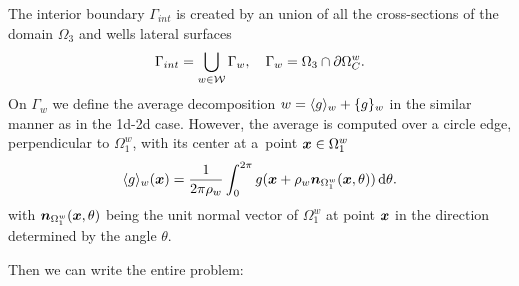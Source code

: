 The interior boundary $\Gamma_{int}$ is created by an union of all the cross-sections of the domain $\Omega_3$
and wells lateral surfaces
\begin{equation}
    \Gamma_{int} = \bigcup_{\substack{w\in\mathcal{W}}} \Gamma_w, \quad \Gamma_w = \Omega_3 \cap \partial\Omega^w_C.
\end{equation}
On $\Gamma_w$ we define the average decomposition $w = \langle g\rangle_w + \{g\}_w$ in the similar manner
as in the 1d-2d case. However, the average is computed over a circle edge, perpendicular to $\Omega^w_1$,
with its center at a~point $\mathbf{\boldsymbol{x}}\in \Omega^w_1$
\begin{equation} \label{eqn:average_definition_3d}
    \langle g\rangle_w(\mathbf{\boldsymbol{x}}) = \frac{1}{2\pi\rho_w} \int_0^{2\pi} g (\mathbf{\boldsymbol{x}} + \rho_w \mathbf{\boldsymbol{n}}_{\Omega^w_1}(\mathbf{\boldsymbol{x}},\theta)) \,{\rm d} \theta.
\end{equation}
with $\mathbf{\boldsymbol{n}}_{\Omega^w_1}(\mathbf{\boldsymbol{x}},\theta)$ being the unit normal vector of $\Omega^w_1$ at point $\mathbf{\boldsymbol{x}}$ in the direction
determined by the angle $\theta$.

Then we can write the entire problem:

